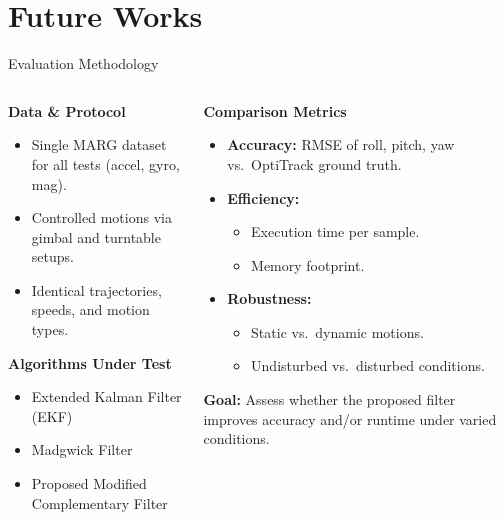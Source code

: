 \documentclass[aspectratio=169,xcolor=dvipsnames]{beamer}
\begin{document}
\section{Future Works}


\begin{frame}{Evaluation Methodology}
\scriptsize
\begin{columns}[T]
  \begin{column}{0.48\textwidth}
    \textbf{Data \& Protocol}
    \begin{itemize}
      \item Single MARG dataset for all tests (accel, gyro, mag).
      \item Controlled motions via gimbal and turntable setups.
      \item Identical trajectories, speeds, and motion types.
    \end{itemize}
    \vspace{0.5em}
    \textbf{Algorithms Under Test}
    \begin{itemize}
      \item Extended Kalman Filter (EKF)
      \item Madgwick Filter
      \item Proposed Modified Complementary Filter
    \end{itemize}
  \end{column}

  \begin{column}{0.48\textwidth}
    \textbf{Comparison Metrics}
    \begin{itemize}
      \item \textbf{Accuracy:} RMSE of roll, pitch, yaw vs.\ OptiTrack ground truth.
      \item \textbf{Efficiency:}
        \begin{itemize}
          \item Execution time per sample.
          \item Memory footprint.
        \end{itemize}
      \item \textbf{Robustness:}
        \begin{itemize}
          \item Static vs.\ dynamic motions.
          \item Undisturbed vs.\ disturbed conditions.
        \end{itemize}
    \end{itemize}
    \vspace{0.5em}
    \textbf{Goal:} Assess whether the proposed filter improves accuracy and/or runtime under varied conditions.
  \end{column}
\end{columns}
\end{frame}
\end{document}
